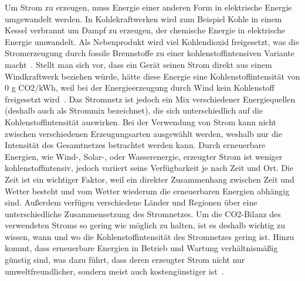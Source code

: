 Um Strom zu erzeugen, muss Energie einer anderen Form in elektrische Energie umgewandelt werden.
In Kohlekraftwerken wird zum Beispiel Kohle in einem Kessel verbrannt um Dampf zu erzeugen, der chemische Energie in elektrische Energie umwandelt.
Als Nebenprodukt wird viel Kohlendioxid freigesetzt, was die Stromerzeugung durch fossile Brennstoffe zu einer kohlenstoffintensiven Variante macht~\cite{Currie.2024}.
Stellt man sich vor, dass ein Gerät seinen Strom direkt aus einem Windkraftwerk beziehen würde, hätte diese Energie eine Kohlenstoffintensität von 0 g \ac{CO2}/\ac{kWh}, weil bei der Energieerzeugung durch Wind kein Kohlenstoff freigesetzt wird~\cite{GreenSoftwareFoundation.2022}.
Das Stromnetz ist jedoch ein Mix verschiedener Energiequellen (deshalb auch als Strommix bezeichnet), die sich unterschiedlich auf die Kohlenstoffintensität auswirken.
Bei der Verwendung von Strom kann nicht zwischen verschiedenen Erzeugungsarten ausgewählt werden, weshalb nur die Intensität des Gesamtnetzes betrachtet werden kann.
Durch erneuerbare Energien, wie Wind-, Solar-, oder Wasserenergie, erzeugter Strom ist weniger kohlenstoffintensiv, jedoch variiert seine Verfügbarkeit je nach Zeit und Ort.
Die Zeit ist ein wichtiger Faktor, weil ein direkter Zusammenhang zwischen Zeit und Wetter besteht und vom Wetter wiederum die erneuerbaren Energien abhängig sind.
Außerdem verfügen verschiedene Länder und Regionen über eine unterschiedliche Zusammensetzung des Stromnetzes.
Um die \ac{CO2}-Bilanz des verwendeten Stroms so gering wie möglich zu halten, ist es deshalb wichtig zu wissen, wann und wo die Kohlenstoffintensität des Stromnetzes gering ist.
Hinzu kommt, dass erneuerbare Energien in Betrieb und Wartung verhältnismäßig günstig sind, was dazu führt, dass deren erzeugter Strom nicht nur umweltfreundlicher, sondern meist auch kostengünstiger ist~\cite{NationalGrid.20231106T13:28:05.000Z}.

